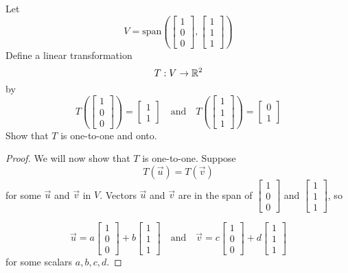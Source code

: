 \documentclass{ximera}
\begin{document}
\begin{example}\label{ex:subtosub} Let $$V=\text{span}\left(\begin{bmatrix}1\\0\\0\end{bmatrix}, \begin{bmatrix}1\\1\\1\end{bmatrix}\right)$$
Define a linear transformation $$T:V\rightarrow \mathbb{R}^2$$
by $$T\left(\begin{bmatrix}1\\0\\0\end{bmatrix}\right)=\begin{bmatrix}1\\1\end{bmatrix}\quad \text{and} \quad T\left(\begin{bmatrix}1\\1\\1\end{bmatrix}\right)=\begin{bmatrix}0\\1\end{bmatrix}$$
Show that $T$ is one-to-one and onto.
\begin{proof}
We will now show that $T$ is one-to-one.  
Suppose 
$$T(\vec{u})=T(\vec{v})$$
for some $\vec{u}$ and $\vec{v}$ in $V$. Vectors $\vec{u}$ and $\vec{v}$ are in the span of $\begin{bmatrix}1\\0\\0\end{bmatrix}$ and $\begin{bmatrix}1\\1\\1\end{bmatrix}$, so

$$\vec{u}=a\begin{bmatrix}1\\0\\0\end{bmatrix}+b\begin{bmatrix}1\\1\\1\end{bmatrix}\quad\text{and}\quad \vec{v}=c\begin{bmatrix}1\\0\\0\end{bmatrix}+d\begin{bmatrix}1\\1\\1\end{bmatrix}$$
for some scalars $a, b, c, d$.


\end{proof}
\end{example}
\end{document}
